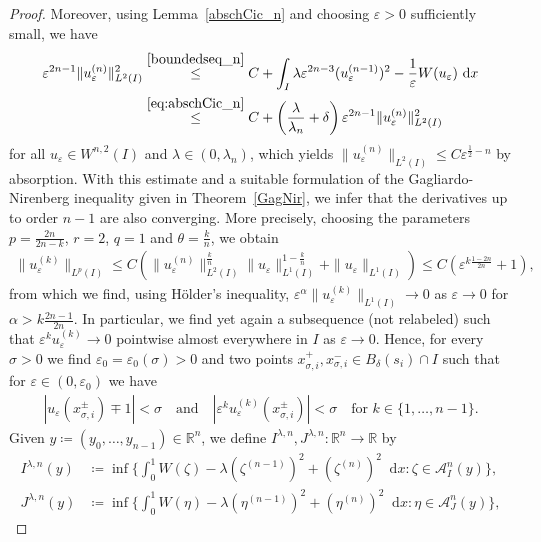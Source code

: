 \documentclass{article}
\newcommand{\dd}{\mathop{}\mathrm{d}} %
\newcommand{\lam}{\lambda}
\newcommand{\eps}{\varepsilon}
\numberwithin{figure}{section}
\def\AAA{{\mathcal A}} \def\calB{{\mathcal B}} \def\calC{{\mathcal C}}
\newcommand{\R}{\mathbb{R}}
\numberwithin{equation}{section}
\begin{document}
\begin{proof}
    \noindent Moreover, using Lemma~\ref{abschCic_n} and choosing $\eps>0$ sufficiently small, we have
    \begin{align}
        \eps^{2n-1} \|u_\eps^{(n)}\|^2_{L^2(I)} 
        & \overset{\eqref{boundedseq_n}}{\leq} C+ \int_I \lam\eps^{2n-3} (u_\eps^{(n-1)})^2 - \frac 1\eps W(u_\eps)\dd x \\
        & \overset{\eqref{eq:abschCic_n}}{\leq} C + \left(\frac{\lam}{\lam_n} + \delta\right) \eps^{2n-1} \|u_\eps^{(n)}\|_{L^2(I)}^2 
    \end{align}
    for all $u_\eps \in W^{n,2}(I)$ and $\lam \in (0,\lam_n)$, which yields $\|u_\eps^{(n)}\|_{L^2(I)} \leq C \eps^{\frac 12 -n}$ by absorption. With this estimate and a suitable formulation of the Gagliardo-Nirenberg inequality given in Theorem~\ref{GagNir}, we infer that the derivatives up to order $n-1$ are also converging. More precisely, choosing the parameters $p = \frac{2n}{2n - k}$, $r = 2$, $q = 1$ and $\theta = \frac kn$, we obtain
        \begin{align}
            \|u_\eps^{(k)}\|_{L^p(I)} \leq C \left(\|u_\eps^{(n)}\|_{L^2(I)}^{\frac kn} \|u_\eps\|_{L^1(I)}^{1 - \frac kn} + \|u_\eps\|_{L^1(I)} \right) \leq C\left(\eps^{k\frac{1 - 2n}{2n}} + 1\right),
        \end{align}
    from which we find, using Hölder's inequality, $\eps^\alpha \|u_\eps^{(k)}\|_{L^1(I)} \to 0$ as $\eps \to 0$ for $\alpha > k \frac{2n - 1}{2n}$. In particular, we find yet again a subsequence (not relabeled) such that $\eps^{k} u^{(k)}_\eps \to 0$ pointwise almost everywhere in $I$ as $\eps \to 0$. Hence, for every $\sigma > 0$ we find $\eps_0 = \eps_0(\sigma) > 0$ and two points $x_{\sigma,i}^+,x_{\sigma,i}^- \in B_\delta(s_i)\cap I$ such that for $\eps  \in (0,\eps_0)$ we have
    \begin{align} \label{convlower}
      |u_\eps(x_{\sigma,i}^\pm)\mp 1|<\sigma \quad \text{and} \quad
      |\eps^{k} u^{(k)}_\eps(x_{\sigma,i}^\pm)|<\sigma \quad \text{for } k \in \{1,\ldots, n-1\}. 
    \end{align}
    Given $y \coloneq (y_0,\ldots,y_{n-1}) \in \R^n$, we define $I^{\lam,n}, J^{\lam,n}: \R^n \to \R$ by
    \begin{align}
        I^{\lam,n}(y)&\coloneq \inf \Big\{ \int_0^1 W(\zeta)-\lam(\zeta^{(n-1)})^2+(\zeta^{(n)})^2\dd x: \zeta \in \AAA^n_I(y) \Big\},\\
        J^{\lam,n}(y)&\coloneq \inf \Big\{ \int_0^1 W(\eta)-\lam(\eta^{(n-1)})^2+(\eta^{(n)})^2\dd x: \eta \in \AAA^n_J(y) \Big\},
    \end{align}

\end{proof}
\end{document}
